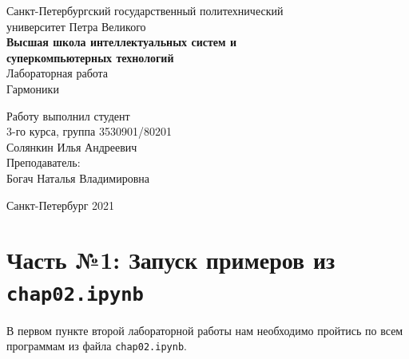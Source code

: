 \documentclass[a4paper]{article}
\begin{document}
    \begin{center}
        \begin{center}
        \hfill \break
        \normalsize{Санкт-Петербургский государственный политехнический}\\
        \normalsize{университет Петра Великого}\\
        \hfill \break
        \normalsize{\textbf{Высшая школа интеллектуальных систем и}}\\ 
        \normalsize{\textbf{суперкомпьютерных технологий}}\\ 
        \hfill \break
        \hfill \break
        \hfill \break
        \normalsize{Лабораторная работа}\\
        \hfill \break
        \hfill \break
        \normalsize{\LARGE Гармоники}\\
        \end{center}
        \hfill \break
        \hfill \break
        \hfill \break
        \hfill \break
        \hfill \break
        \hfill \break
        \hfill \break
        \hfill \break
        \hfill \break
        \hfill \break
        \begin{flushright}
            \normalsize{Работу выполнил студент}\\
            \normalsize{3-го курса, группа 3530901/80201}\\
            \normalsize{Солянкин Илья Андреевич}\\
            \hfill \break
            \normalsize{Преподаватель:}\\
            \normalsize{Богач Наталья Владимировна}\\
        \end{flushright}
        \hfill \break
        \hfill \break
        \hfill \break
        \hfill \break
        \begin{center} Санкт-Петербург 2021 \end{center}
        \thispagestyle{empty}
    \end{center}
    
    \newpage
        \tableofcontents
    
    \newpage
         \listoffigures
    
    \newpage
         \lstlistoflistings   
     
    \newpage
        \section{Часть №1: Запуск примеров из \texttt{chap02.ipynb}}
            В первом пункте второй лабораторной работы нам необходимо пройтись по всем программам из файла \texttt{chap02.ipynb}. 
            
\end{document}

